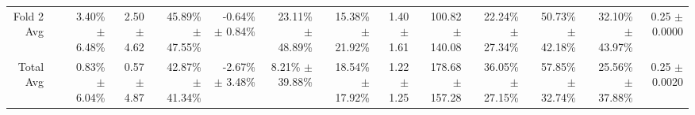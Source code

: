 \begin{table}[H]
{\begin{tabular}{rrrrrrrrrrrrrr}
Fold 2 Avg &  & \shortstack{3.40\% \\ $\pm$ 6.48\%} & \shortstack{2.50 \\ $\pm$ 4.62} & \shortstack{45.89\% \\ $\pm$ 47.55\%} & \shortstack{-0.64\% \\ $\pm$ 0.84\%} & \shortstack{23.11\% \\ $\pm$ 48.89\%} & \shortstack{15.38\% \\ $\pm$ 21.92\%} & \shortstack{1.40 \\ $\pm$ 1.61} & \shortstack{100.82 \\ $\pm$ 140.08} & \shortstack{22.24\% \\ $\pm$ 27.34\%} & \shortstack{50.73\% \\ $\pm$ 42.18\%} & \shortstack{32.10\% \\ $\pm$ 43.97\%} & \shortstack{0.25 \\ $\pm$ 0.0000} \\
Total Avg &  & \shortstack{0.83\% \\ $\pm$ 6.04\%} & \shortstack{0.57 \\ $\pm$ 4.87} & \shortstack{42.87\% \\ $\pm$ 41.34\%} & \shortstack{-2.67\% \\ $\pm$ 3.48\%} & \shortstack{8.21\% \\ $\pm$ 39.88\%} & \shortstack{18.54\% \\ $\pm$ 17.92\%} & \shortstack{1.22 \\ $\pm$ 1.25} & \shortstack{178.68 \\ $\pm$ 157.28} & \shortstack{36.05\% \\ $\pm$ 27.15\%} & \shortstack{57.85\% \\ $\pm$ 32.74\%} & \shortstack{25.56\% \\ $\pm$ 37.88\%} & \shortstack{0.25 \\ $\pm$ 0.0020} \\
\bottomrule
\end{tabular}}
\end{table}
